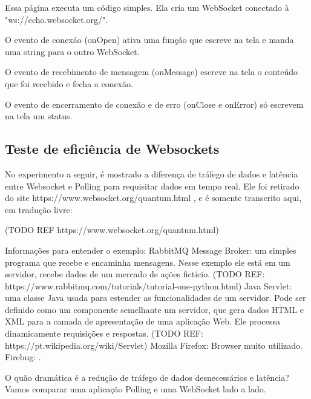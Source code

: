 \documentclass[a4paper,12pt]{article}
\begin{document}
Essa página executa um código simples. Ela cria um WebSocket conectado à "ws://echo.websocket.org/".

O evento de conexão (onOpen) ativa uma função que escreve na tela e manda uma string para o outro WebSocket.

O evento de recebimento de mensagem (onMessage) escreve na tela o conteúdo que foi recebido e fecha a conexão.

O evento de encerramento de conexão e de erro (onClose e onError) só escrevem na tela um status.





\subsection{Teste de eficiência de Websockets}


No experimento a seguir, é mostrado a diferença de tráfego de dados e latência entre Websocket e Polling para requisitar dados em tempo real. Ele foi retirado do site https://www.websocket.org/quantum.html , e é somente transcrito aqui, em tradução livre:

(TODO REF https://www.websocket.org/quantum.html)


Informações para entender o exemplo:
RabbitMQ Message Broker: um simples programa que recebe e encaminha mensagens. Nesse exemplo ele está em um servidor, recebe dados de um mercado de ações fictício. (TODO REF: https://www.rabbitmq.com/tutorials/tutorial-one-python.html)
Java Servlet: uma classe Java usada para estender as funcionalidades de um servidor. Pode ser definido como um componente semelhante um servidor, que gera dados HTML e XML para a camada de apresentação de uma aplicação Web. Ele processa dinamicamente requisições e respostas. (TODO REF: https://pt.wikipedia.org/wiki/Servlet)
Mozilla Firefox: Browser muito utilizado.
Firebug: .

O quão dramática é a redução de tráfego de dados desnecessários e latência? Vamos comparar uma aplicação Polling e uma WebSocket lado a lado.
\end{document}
